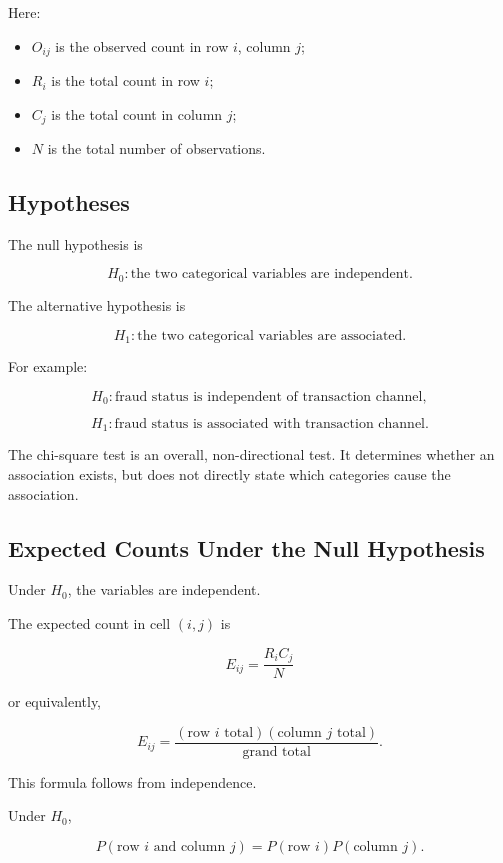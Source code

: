 \documentclass[11pt]{article}
\begin{document}
Here:

\begin{itemize}[noitemsep]
    \item \(O_{ij}\) is the observed count in row \(i\), column \(j\);
    \item \(R_i\) is the total count in row \(i\);
    \item \(C_j\) is the total count in column \(j\);
    \item \(N\) is the total number of observations.
\end{itemize}

\subsection{Hypotheses}

The null hypothesis is

\[
H_0:
\text{the two categorical variables are independent}.
\]

The alternative hypothesis is

\[
H_1:
\text{the two categorical variables are associated}.
\]

For example:

\[
H_0:
\text{fraud status is independent of transaction channel},
\]

\[
H_1:
\text{fraud status is associated with transaction channel}.
\]

The chi-square test is an overall, non-directional test. It determines
whether an association exists, but does not directly state which
categories cause the association.

\subsection{Expected Counts Under the Null Hypothesis}

Under \(H_0\), the variables are independent.

The expected count in cell \((i,j)\) is

\[
\boxed{
E_{ij}
=
\frac{R_iC_j}{N}
}
\]

or equivalently,

\[
\boxed{
E_{ij}
=
\frac{
(\text{row }i\text{ total})
(\text{column }j\text{ total})
}{
\text{grand total}
}.
}
\]

This formula follows from independence.

Under \(H_0\),

\[
P(\text{row }i\text{ and column }j)
=
P(\text{row }i)P(\text{column }j).
\]
\end{document}
